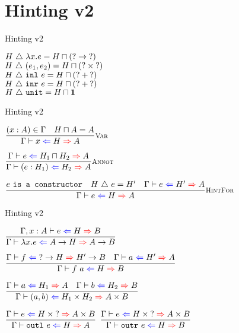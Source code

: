 \documentclass{beamer}
\newcommand{\Fun}[2]{#1 \to #2}
\newcommand{\Prod}[2]{#1 \times #2}
\newcommand{\Sum}[2]{#1 + #2}
\newcommand{\Unit}{\textbf{1}}
\newcommand{\annot}[2]{(#1 : #2)}
\newcommand{\fun}[2]{\lambda #1. #2}
\newcommand{\app}[2]{#1\ #2}
\newcommand{\pair}[2]{(#1, #2)}
\newcommand{\outl}[1][]{\texttt{outl}\ #1}
\newcommand{\outr}[1][]{\texttt{outr}\ #1}
\newcommand{\inl}[1][]{\texttt{inl}\ #1}
\newcommand{\inr}[1][]{\texttt{inr}\ #1}
\newcommand{\unit}{\texttt{unit}}
\newcommand{\infrule}[3][]{\displaystyle \frac{#2}{#3} \textsc{\footnotesize{#1}}}
\newcommand{\extend}[3]{#1, #2 : #3}
\newcommand{\sidecond}[1]{#1}
\begin{document}
\section{Hinting v2}

\newcommand{\hintfor}[2]{#1\ \triangle\ #2}

\begin{frame}{Hinting v2}

\begin{center}
  $\hintfor{H}{\fun{x}{e}} = \combinehints{H}{(\Fun{\Hint}{\Hint})}$ \\
  $\hintfor{H}{\pair{e_1}{e_2}} = \combinehints{H}{(\Prod{\Hint}{\Hint})}$ \\
  $\hintfor{H}{\inl[e]} = \combinehints{H}{(\Sum{\Hint}{\Hint})}$ \\
  $\hintfor{H}{\inr[e]} = \combinehints{H}{(\Sum{\Hint}{\Hint})}$ \\
  $\hintfor{H}{\unit} = \combinehints{H}{\Unit}$
\end{center}

\end{frame}

\begin{frame}{Hinting v2}

\begin{center}
  $\infrule[Var]{\sidecond{(x : A) \in \Gamma} \quad \sidecond{\combinehints{H}{A} = A}}{\hinting{x}{H}{A}}$

  \vspace{2em}

  $\infrule[Annot]{\hinting{e}{\combinehints{H_1}{H_2}}{A}}{\hinting{\annot{e}{H_1}}{H_2}{A}}$

  \vspace{2em}

  $\infrule[HintFor]{\sidecond{e\ \texttt{is a constructor}} \quad \sidecond{\hintfor{H}{e} = H'} \quad \hinting{e}{H'}{A}}{\hinting{e}{H}{A}}$
\end{center}
  
\end{frame}
  
\begin{frame}{Hinting v2}
  
\begin{center}
  $\infrule{\fullhinting{\extend{\Gamma}{x}{A}}{e}{H}{B}}{\hinting{\fun{x}{e}}{\Fun{A}{H}}{\Fun{A}{B}}}$

  \vspace{1em}

  $\infrule{\hinting{f}{\Fun{\Hint}{H}}{\Fun{H'}{B}} \quad \hinting{a}{H'}{A}}{\hinting{\app{f}{a}}{H}{B}}$

  \vspace{1em}

  $\infrule{\hinting{a}{H_1}{A} \quad \hinting{b}{H_2}{B}}{\hinting{\pair{a}{b}}{\Prod{H_1}{H_2}}{\Prod{A}{B}}}$

  \vspace{1em}

  $\infrule{\hinting{e}{\Prod{H}{\Hint}}{\Prod{A}{B}}}{\hinting{\outl[e]}{H}{A}}$ \quad
  $\infrule{\hinting{e}{\Prod{H}{\Hint}}{\Prod{A}{B}}}{\hinting{\outr[e]}{H}{B}}$
\end{center}
  
\end{frame}
  
\end{document}
